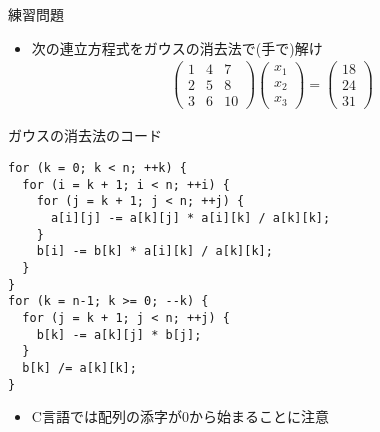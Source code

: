 \documentclass[dvipdfmx]{beamer}
\begin{document}
\begin{frame}[t,fragile]{練習問題}
  \begin{itemize}
    \setlength{\itemsep}{1em}
  \item 次の連立方程式をガウスの消去法で(手で)解け
    \begin{align*}
      \begin{pmatrix} 1 & 4 & 7 \\ 2 & 5 & 8 \\ 3 & 6 & 10 \end{pmatrix} \begin{pmatrix} x_1 \\ x_2 \\ x_3 \end{pmatrix} = \begin{pmatrix} 18 \\ 24 \\ 31 \end{pmatrix}
    \end{align*}
  \end{itemize}
\end{frame}

\begin{frame}[t,fragile]{ガウスの消去法のコード}
\begin{lstlisting}
for (k = 0; k < n; ++k) {
  for (i = k + 1; i < n; ++i) {
    for (j = k + 1; j < n; ++j) {
      a[i][j] -= a[k][j] * a[i][k] / a[k][k];
    }
    b[i] -= b[k] * a[i][k] / a[k][k];
  }
}
for (k = n-1; k >= 0; --k) {
  for (j = k + 1; j < n; ++j) {
    b[k] -= a[k][j] * b[j];
  }
  b[k] /= a[k][k];
}
\end{lstlisting}
\begin{itemize}
\item C言語では配列の添字が0から始まることに注意
\end{itemize}
\end{frame}
\end{document}
